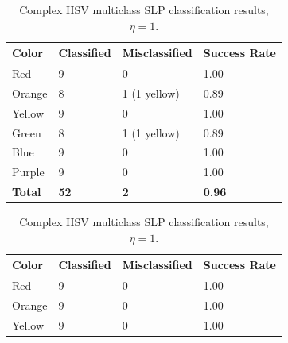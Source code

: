 \documentclass[twoside]{IEEEtran}
\begin{document}
\begin{table}[!t]
    \centering

    \begin{minipage}{\columnwidth}
        \centering
        \caption{RGB multiclass SLP classification results, \( \eta = 1 \).}%
        \label{rgb_slp}
        \begin{tabular}{ l l l l }
            \toprule
            \bfseries Color & \bfseries Classified & \bfseries Misclassified & \bfseries Success Rate \\
            \midrule
            Red             & 9                    & 0                       & 1.00                   \\
            Orange          & 8                    & 1 (1 yellow)            & 0.89                   \\
            Yellow          & 9                    & 0                       & 1.00                   \\
            Green           & 8                    & 1 (1 yellow)            & 0.89                   \\
            Blue            & 9                    & 0                       & 1.00                   \\
            Purple          & 9                    & 0                       & 1.00                   \\
            \midrule
            \bfseries Total & \bfseries 52         & \bfseries 2             & \bfseries 0.96         \\
            \bottomrule
        \end{tabular}
    \end{minipage}%
    \begin{minipage}{\columnwidth}
        \centering
        \caption{Complex HSV multiclass SLP classification results, \( \eta = 1 \).}%
        \label{hsv_slp}
        \begin{tabular}{ l l l l }
            \toprule
            \bfseries Color & \bfseries Classified & \bfseries Misclassified & \bfseries Success Rate \\
            \midrule
            Red             & 9                    & 0                       & 1.00                   \\
            Orange          & 9                    & 0                       & 1.00                   \\
            Yellow          & 9                    & 0                       & 1.00                   \\

\end{tabular}
\end{minipage}
\end{table}
\end{document}
